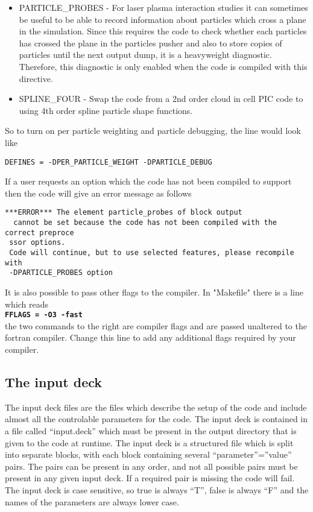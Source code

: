 \documentclass[12pt,a4paper]{article}
\newcommand{\simpleboxverbatim}{\begin{Verbatim}[obeytabs=true,frame=single,
  framerule=0.5mm,rulecolor=\color{warwickmid},formatcom=\color{black}]}
\newcommand{\inlinecode}[1]{{\color{warwickred} \bf\texttt{#1}}}
\newcommand{\EPOCH}{{\color{warwickdark}\fontfamily{phv}\selectfont{EPOCH}}}
\begin{document}
\begin{itemize}
  tracer particles. Tracer particles are specified like normal particles, and
  move about as would a normal particle with the same charge and mass, but
  tracer particles do not generate any current and are therefore passive
  elements in the simulation. Any attempt to add particle collision effects
  should remember that tracer species should not interact through collisions.
\item PARTICLE\_PROBES - For laser plasma interaction studies it can sometimes
  be useful to be able to record information about particles which cross a
  plane in the simulation. Since this requires the code to check whether each
  particles has crossed the plane in the particles pusher and also to store
  copies of particles until the next output dump, it is a heavyweight
  diagnostic. Therefore, this diagnostic is only enabled when the code is
  compiled with this directive.
\item SPLINE\_FOUR - Swap the code from a 2nd order cloud in cell PIC code to
  using 4th order spline particle shape functions.
\end{itemize}

So to turn on per particle weighting and particle debugging, the line would
look like\\
\simpleboxverbatim
DEFINES = -DPER_PARTICLE_WEIGHT -DPARTICLE_DEBUG
\end{Verbatim}

If a user requests an option which the code has not been compiled to support
then the code will give an error message as follows
\simpleboxverbatim
 ***ERROR*** The element particle_probes of block output
  cannot be set because the code has not been compiled with the correct preproce
 ssor options.
 Code will continue, but to use selected features, please recompile with
 -DPARTICLE_PROBES option
\end{Verbatim}

It is also possible to pass other flags to the compiler. In "Makefile" there is
a line which reads\\
\inlinecode{FFLAGS = -O3 -fast}\\
the two commands to the right are compiler flags and are passed unaltered to
the fortran compiler. Change this line to add any additional flags required by
your compiler.

\subsection{The {\EPOCH} input deck}
The input deck files are the files which describe the setup of the code and
include almost all the controlable parameters for the code. The input deck is
contained in a file called ``input.deck'' which must be present in the output
directory that is given to the code at runtime. The input deck is a structured
file which is split into separate blocks, with each block containing several
``parameter''=''value'' pairs. The pairs can be present in any order, and not
all possible pairs must be present in any given input deck. If a required pair
is missing the code will fail. The input deck is case sensitive, so true is
always ``T'', false is always ``F'' and the names of the parameters are always
lower case.\\
\end{document}
